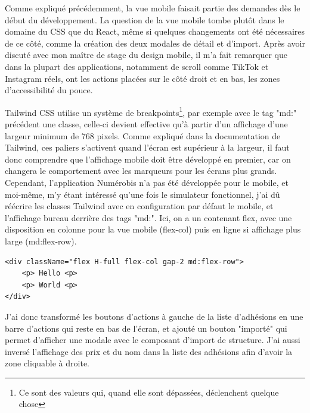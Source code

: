 \documentclass[a4paper,12pt]{report}
\begin{document}
Comme expliqué précédemment, la vue mobile faisait partie des demandes dès le début du développement. La question de la vue mobile tombe plutôt dans le domaine du CSS que du React, même si quelques changements ont été nécessaires de ce côté, comme la création des deux modales de détail et d'import. Après avoir discuté avec mon maître de stage du design mobile, il m'a fait remarquer que dans la plupart des applications, notamment de scroll comme TikTok et Instagram réels, ont les actions placées sur le côté droit et en bas, les zones d'accessibilité du pouce.

Tailwind CSS utilise un système de breakpoints\footnote{Ce sont des valeurs qui, quand elle sont dépassées, déclenchent quelque chose}, par exemple avec le tag "md:" précédent une classe, celle-ci devient effective qu'à partir d'un affichage d'une largeur minimum de 768 pixels. Comme expliqué dans la documentation de Tailwind, ces paliers s'activent quand l'écran est supérieur à la largeur, il faut donc comprendre que l'affichage mobile doit être développé en premier, car on changera le comportement avec les marqueurs pour les écrans plus grands. Cependant, l'application Numérobis n'a pas été développée pour le mobile, et moi-même, m'y étant intéressé qu'une fois le simulateur fonctionnel, j'ai dû réécrire les classes Tailwind avec en configuration par défaut le mobile, et l'affichage bureau derrière des tags "md:". Ici, on a un contenant flex, avec une disposition en colonne pour la vue mobile (flex-col) puis en ligne si affichage plus large (md:flex-row).


\begin{verbatim}
<div className="flex H-full flex-col gap-2 md:flex-row">
    <p> Hello <p>
    <p> World <p>
</div>
\end{verbatim}


J'ai donc transformé les boutons d'actions à gauche de la liste d'adhésions en une barre d'actions qui reste en bas de l'écran, et ajouté un bouton "importé" qui permet d'afficher une modale avec le composant d'import de structure. J'ai aussi inversé l'affichage des prix et du nom dans la liste des adhésions afin d'avoir la zone cliquable à droite.
\end{document}
